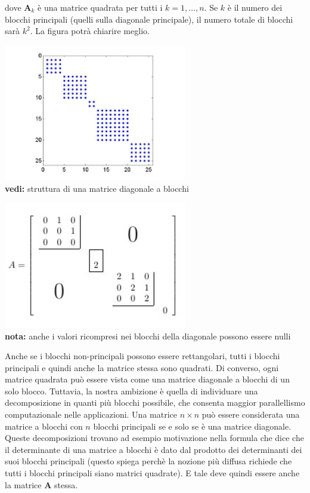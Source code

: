 dove $\mathbf{A}_k$ è una matrice quadrata per tutti i $k = 1, \ldots, n$.
Se $k$ è il numero dei blocchi principali (quelli sulla diagonale principale), il numero totale di blocchi sarà $k^2$.
La figura potrà chiarire meglio.
\begin{table}[!h]
  \begin{minipage}{.5\textwidth}
    \centering
    \includegraphics[width=0.60\textwidth]{figures/block_diag_mat_gen_example.png}\\
    {\bf vedi:} struttura di una matrice diagonale a blocchi
  \end{minipage}%
  \begin{minipage}{.5\textwidth}
    \centering
    \includegraphics[width=0.60\textwidth]{figures/block_diag_mat_one_example_with_structure_highlighted.png}\\
    {\bf nota:} anche i valori ricompresi nei blocchi della diagonale possono essere nulli
    \end{minipage}
\end{table}

Anche se i blocchi non-principali possono essere rettangolari, tutti i blocchi principali e quindi anche la matrice stessa sono quadrati.
Di converso, ogni matrice quadrata può essere vista come una matrice diagonale a blocchi di un solo blocco. Tuttavia, la nostra ambizione è quella di individuare una decomposizione in quanti più blocchi possibile, che consenta maggior parallellismo computazionale nelle applicazioni. Una matrice $n\times n$ può essere considerata una matrice a blocchi con $n$ blocchi principali se e solo se è una matrice diagonale. Queste decomposizioni trovano ad esempio motivazione nella formula che dice che il determinante di una matrice a blocchi è dato dal prodotto dei determinanti dei suoi blocchi principali (questo spiega perchè la nozione più diffusa richiede che tutti i blocchi principali siano matrici quadrate). E tale deve quindi essere anche la matrice $\mathbf{A}$ stessa. 

